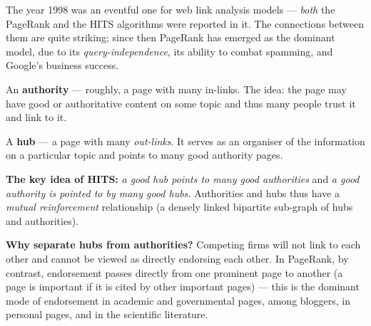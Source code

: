 \documentclass[11pt,a4paper]{article}
\theoremstyle{definition}
\begin{document}
The year 1998 was an eventful one for web link analysis models --- \emph{both} the PageRank and the
HITS algorithms were reported in it. The connections between them are quite striking; since then
PageRank has emerged as the dominant model, due to its \emph{query-independence}, its ability to
combat spamming, and Google's business success.

\begin{defbox}
An \textbf{authority} --- roughly, a page with many in-links. The idea: the page may have good or
authoritative content on some topic and thus many people trust it and link to it.

A \textbf{hub} --- a page with many \emph{out-links}. It serves as an organiser of the information on
a particular topic and points to many good authority pages.

\textbf{The key idea of HITS:} \emph{a good hub points to many good authorities} and \emph{a good
authority is pointed to by many good hubs.} Authorities and hubs thus have a \emph{mutual
reinforcement} relationship (a densely linked bipartite sub-graph of hubs and authorities).

\textbf{Why separate hubs from authorities?} Competing firms will not link to each other and cannot be
viewed as directly endorsing each other. In PageRank, by contrast, endorsement passes directly from
one prominent page to another (a page is important if it is cited by other important pages) --- this
is the dominant mode of endorsement in academic and governmental pages, among bloggers, in personal
pages, and in the scientific literature.
\end{defbox}
\end{document}
